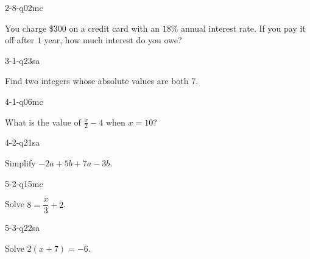 \begin{practiceQuestion}{2-8-q02}{mc}
\begin{questionText}
You charge $\$300$ on a credit card with an $18\%$ annual interest rate. If you pay it off after $1$ year, how much interest do you owe?
\end{questionText}
\end{practiceQuestion}

\begin{practiceQuestion}{3-1-q23}{sa}
\begin{questionText}
Find two integers whose absolute values are both $7$.
\end{questionText}
\end{practiceQuestion}

\begin{practiceQuestion}{4-1-q06}{mc}
\begin{questionText}
What is the value of $\frac{x}{2} - 4$ when $x = 10$?
\end{questionText}
\end{practiceQuestion}

\begin{practiceQuestion}{4-2-q21}{sa}
\begin{questionText}
Simplify $-2a + 5b + 7a - 3b$.
\end{questionText}
\end{practiceQuestion}

\begin{practiceQuestion}{5-2-q15}{mc}
\begin{questionText}
Solve $8 = \dfrac{x}{3} + 2$.
\end{questionText}
\end{practiceQuestion}

\begin{practiceQuestion}{5-3-q22}{sa}
\begin{questionText}
Solve $2(x + 7) = -6$.
\end{questionText}
\end{practiceQuestion}

